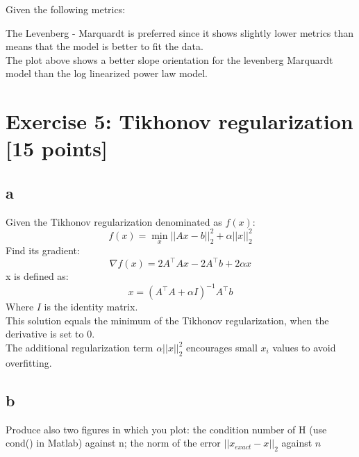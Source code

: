 \documentclass[unicode,11pt,a4paper,oneside,numbers=endperiod,openany]{scrartcl}
\begin{document}
Given the following metrics:


The Levenberg - Marquardt is preferred since it shows slightly lower metrics than means that the model is better to fit the data.\\
The plot above shows a better slope orientation for the levenberg Marquardt model than the log linearized power law model.\\

\section*{Exercise 5: Tikhonov regularization [15 points]}

\subsection*{a}

Given the Tikhonov regularization denominated as $f(x)$:
\[
    f(x) = \min_{x} ||Ax - b||_2^2 + \alpha ||x||_2^2
\]
Find its gradient:
\[
    \nabla f(x) = 2A^{\top}Ax - 2A^{\top}b + 2\alpha x
\]
x is defined as:
\[
    x = (A^{\top}A + \alpha I)^{-1}A^{\top}b
\]
Where $I$ is the identity matrix.\\
This solution equals the minimum of the Tikhonov regularization, when the derivative is set to 0.\\
The additional regularization term $\alpha ||x||_2^2$ encourages small $x_i$ values to avoid overfitting.

\subsection*{b}
Produce also two figures
in which you plot: the condition number of H (use cond() in Matlab) against n; the norm of the error
$||x_{exact} - x||_2$ against $n$
\end{document}
